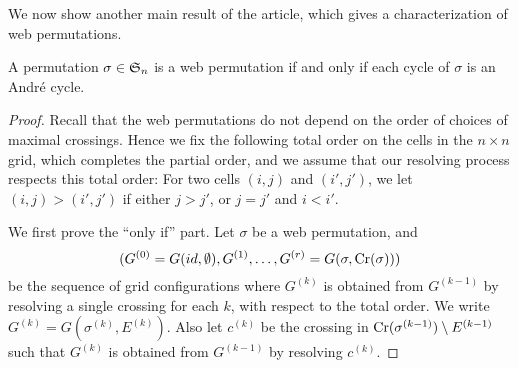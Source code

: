 We now show another main result of the article,
which gives a characterization of web permutations.
\begin{thm} \label{thm:web=andre_cycle}
  A permutation \( \sigma \in \mathfrak{S}_n \) is a web permutation
  if and only if each cycle of \( \sigma \) is an Andr\'e cycle.
\end{thm}
\begin{proof}
  Recall that the web permutations
  do not depend on the order of choices of maximal crossings.
  Hence we fix the following total order on the cells in the \( n \times n \) 
  grid, which completes the partial order,
  and we assume that our resolving process respects this total order:
  For two cells \( (i,j) \) and \( (i',j') \), we let \( (i,j)>(i',j') \)
  if either \( j>j' \), or \( j=j' \) and \( i<i' \).

  We first prove the ``only if'' part.
  Let \( \sigma \) be a web permutation, and
  \[ (G^{(0)}=G(id, \emptyset), G^{(1)}, \dots, G^{(r)}=G(\sigma, \operatorname{Cr}(\sigma))) \]
  be the sequence of grid configurations
  where \( G^{(k)} \) is obtained from \( G^{(k-1)} \) by resolving a single
  crossing for each \( k \), with respect to the total order.
  We write \( G^{(k)} = G(\sigma^{(k)}, E^{(k)}) \).
  Also let \( c^{(k)} \) be the crossing in \( \operatorname{Cr}(\sigma^{(k-1)})\setminus E^{(k-1)} \)
  such that \( G^{(k)} \) is obtained from \( G^{(k-1)} \) by resolving \( c^{(k)} \).
  


\end{proof}

